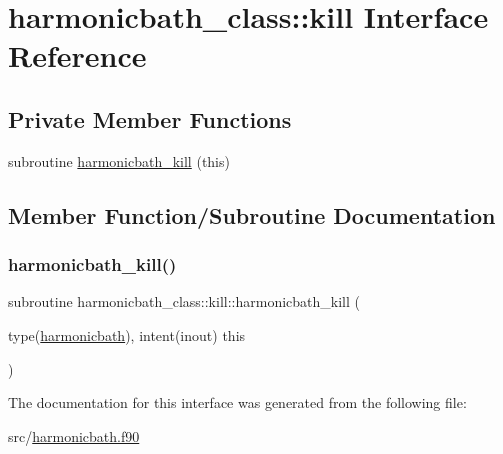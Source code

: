 \hypertarget{interfaceharmonicbath__class_1_1kill}{}\section{harmonicbath\+\_\+class\+:\+:kill Interface Reference}
\label{interfaceharmonicbath__class_1_1kill}
\subsection*{Private Member Functions}
\begin{DoxyCompactItemize}
\item 
subroutine \hyperlink{interfaceharmonicbath__class_1_1kill_a037b17a2340cd14c077a37329757f527}{harmonicbath\+\_\+kill} (this)
\end{DoxyCompactItemize}


\subsection{Member Function/\+Subroutine Documentation}
\mbox{\label{interfaceharmonicbath__class_1_1kill_a037b17a2340cd14c077a37329757f527}} 
\subsubsection{\texorpdfstring{harmonicbath\+\_\+kill()}{harmonicbath\_kill()}}
{\footnotesize\ttfamily subroutine harmonicbath\+\_\+class\+::kill\+::harmonicbath\+\_\+kill (\begin{DoxyParamCaption}\item[{type(\hyperlink{structharmonicbath__class_1_1harmonicbath}{harmonicbath}), intent(inout)}]{this }\end{DoxyParamCaption})\hspace{0.3cm}{\ttfamily [private]}}



The documentation for this interface was generated from the following file\+:\begin{DoxyCompactItemize}
\item 
src/\hyperlink{harmonicbath_8f90}{harmonicbath.\+f90}\end{DoxyCompactItemize}
